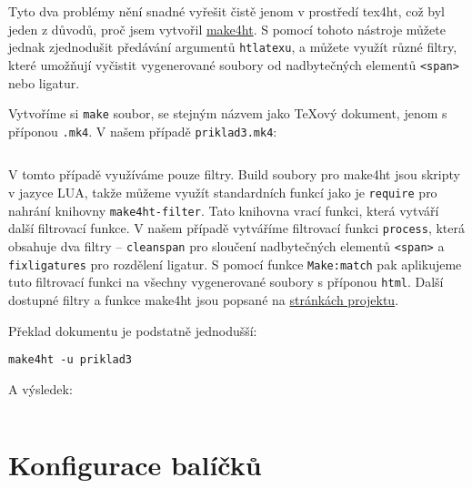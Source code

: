 \documentclass{article}
\begin{document}
Tyto dva problémy nění snadné vyřešit čistě jenom v prostředí \gls{tex4ht},
což byl jeden z důvodů, proč jsem vytvořil \href{https://github.com/michal-h21/make4ht}{make4ht}. S pomocí tohoto nástroje můžete jednak zjednodušit 
předávání argumentů \verb|htlatexu|, a můžete využít různé filtry, které 
umožňují vyčistit vygenerované soubory od nadbytečných elementů \verb|<span>|
nebo ligatur. 

Vytvoříme si \verb|make| soubor, se stejným názvem jako \TeX ový dokument, 
jenom s příponou \verb|.mk4|. V našem případě \verb|priklad3.mk4|:

\inputminted{lua}{priklady/priklad3.mk4}

V tomto případě využíváme pouze filtry. Build soubory pro \gls{make4ht} jsou 
skripty v jazyce LUA, takže můžeme využít standardních funkcí jako je 
\verb|require| pro nahrání knihovny \verb|make4ht-filter|. Tato knihovna
vrací funkci, která vytváří další filtrovací funkce. V našem případě 
vytváříme filtrovací funkci \verb|process|, která obsahuje dva filtry -- 
\verb|cleanspan| pro sloučení nadbytečných elementů \verb|<span>| a 
\verb|fixligatures| pro rozdělení ligatur. S pomocí funkce \verb|Make:match|
pak aplikujeme tuto filtrovací funkci na všechny vygenerované soubory s příponou \verb|html|. Další dostupné filtry a funkce \gls{make4ht} jsou popsané
na \href{https://github.com/michal-h21/make4ht}{stránkách projektu}.




Překlad dokumentu je podstatně jednodušší:

\begin{verbatim}
make4ht -u priklad3
\end{verbatim}

A výsledek:

\inputminted[firstline=17, lastline=19]{html}{priklady/priklad3.html}

\section{Konfigurace balíčků}\label{sec:config}


\printglossary
\printbibliography
\end{document}
